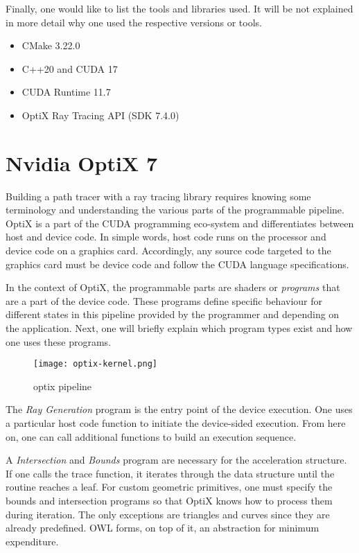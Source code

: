 Finally, one would like to list the tools and libraries used.
It will be not explained in more detail why one used the respective versions or tools.

\begin{itemize}
    \item CMake 3.22.0
    \item C++20 and CUDA 17
    \item CUDA Runtime 11.7
    \item OptiX Ray Tracing API (SDK 7.4.0)
\end{itemize}

\section{Nvidia OptiX 7}

Building a path tracer with a ray tracing library requires knowing some terminology and understanding the various parts of the programmable pipeline.
OptiX is a part of the CUDA programming eco-system and differentiates between host and device code.
In simple words, host code runs on the processor and device code on a graphics card.
Accordingly, any source code targeted to the graphics card must be device code and follow the CUDA language specifications.

In the context of OptiX, the programmable parts are shaders or \textit{programs} that are a part of the device code.
These programs define specific behaviour for different states in this pipeline provided by the programmer and depending on the application.
Next, one will briefly explain which program types exist and how one uses these programs.

\begin{figure}[h]
    \begin{center}
        \texttt{[image: optix-kernel.png]}
    \end{center}
    \caption{optix pipeline}
    \label{fig:optix-kernel}
\end{figure}

The \textit{Ray Generation} program is the entry point of the device execution.
One uses a particular host code function to initiate the device-sided execution.
From here on, one can call additional functions to build an execution sequence.

A \textit{Intersection} and \textit{Bounds} program are necessary for the acceleration structure.
If one calls the trace function, it iterates through the data structure until the routine reaches a leaf.
For custom geometric primitives, one must specify the bounds and intersection programs so that OptiX knows how to process them during iteration.
The only exceptions are triangles and curves since they are already predefined.
OWL forms, on top of it, an abstraction for minimum expenditure.

